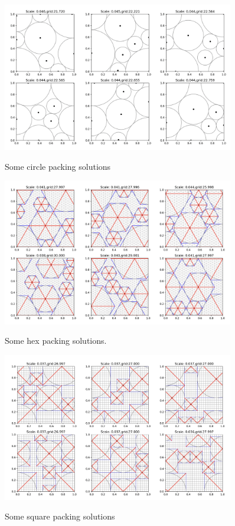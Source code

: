 \documentclass[12pt]{article}
\begin{document}
\begin{figure}
    \centering
    \includegraphics[width=0.9\textwidth]{circle packings2.png}\label{fig:circles}\caption{Some circle packing solutions}
\end{figure}
\begin{figure}
    \centering
    \includegraphics[width=0.9\textwidth]{hex packings 2.png}\label{fig:hexagons}\caption{Some hex packing solutions.}
\end{figure}
\begin{figure}
    \centering
    \includegraphics[width=0.9\textwidth]{square packings 2.png}\label{fig:squares}\caption{Some square packing solutions}
\end{figure}
\end{document}

